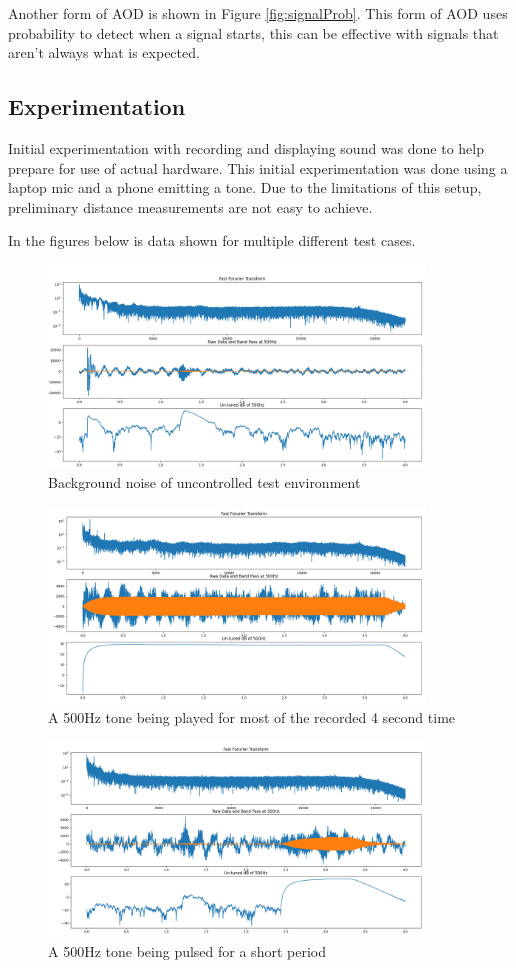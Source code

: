 \documentclass{article}
\begin{document}
Another form of AOD is shown in Figure \ref{fig:signalProb}. This form of AOD uses probability to detect when a signal starts, this can be effective with signals that aren't always what is expected.

\subsection{Experimentation}
Initial experimentation with recording and displaying sound was done to help prepare for use of actual hardware. This initial experimentation was done using a laptop mic and a phone emitting a tone. Due to the limitations of this setup, preliminary distance measurements are not easy to achieve.

In the figures below is data shown for multiple different test cases.

\begin{figure}
	\centering
	\includegraphics[width=10cm]{BackgroundNoise}
	\caption{Background noise of uncontrolled test environment}
	\label{fig:signalShapeOverlay}
\end{figure}

\begin{figure}
	\centering
	\includegraphics[width=10cm]{MostlyConstant500Hz}
	\caption{A 500Hz tone being played for most of the recorded 4 second time}
	\label{fig:signalShapeOverlay}
\end{figure}

\begin{figure}
	\centering
	\includegraphics[width=10cm]{Pulse500Hz}
	\caption{A 500Hz tone being pulsed for a short period}
	\label{fig:signalShapeOverlay}
\end{figure}
\end{document}
